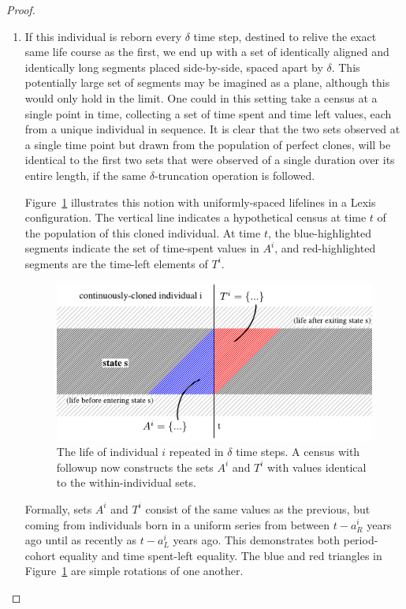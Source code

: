 \documentclass[12pt,oneside,a4paper]{article}
\theoremstyle{definition}
\begin{document}
\begin{proof}
\begin{enumerate}
\FloatBarrier
\item{} If this individual is reborn every $\delta$ time step, destined to
relive the exact same life course as the first, we end up with a set of
identically aligned and identically long segments placed side-by-side, spaced
apart by $\delta$.
This potentially large set of segments may be imagined as a plane, although this
would only hold in the limit.
One could in this setting take a census at a single point in time, collecting a set of
time spent and time left values, each from a unique individual in sequence. It
is clear that the two sets observed at a single time point but drawn from the population of
perfect clones, will be identical to the first two sets that were observed of a single duration over its entire length, if the same
$\delta$-truncation operation is followed.

Figure~\ref{fig:clones} illustrates this notion with uniformly-spaced lifelines
in a Lexis configuration. The vertical line indicates a hypothetical census at time $t$ of
the population of this cloned individual. At time $t$, the blue-highlighted segments indicate
the set of time-spent values in $A^i$, and red-highlighted segments are the
time-left elements of $T^i$. 

 \begin{figure}[h!]
\centering
\caption{The life of individual $i$ repeated in $\delta$ time steps. A
census with followup now constructs the sets $A^i$ and $T^i$ with values
identical to the within-individual sets.}
\label{fig:clones}
\includegraphics[scale=.8]{Figures/lifelinerepeated.pdf}
\end{figure}

Formally, sets $A^i$ and $T^i$ consist of the same values as the previous, but
coming from individuals born in a uniform series from between $t-a_R^i$ years
ago until as recently as $t-a_L^i$ years ago. This demonstrates both
period-cohort equality and time spent-left equality. The blue and red triangles in
Figure~\ref{fig:clones} are simple rotations of one another.


\end{enumerate}
\end{proof}
\end{document}

